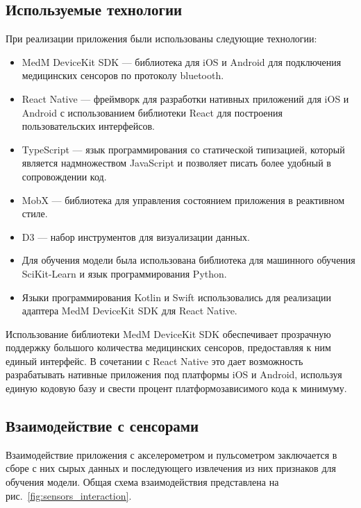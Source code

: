 \documentclass[14pt]{matmex-diploma-custom}
\begin{document}
\subsection{Используемые технологии}
При реализации приложения были использованы следующие технологии:
\begin{itemize}
\item MedM DeviceKit SDK --- библиотека для iOS и Android для подключения
  медицинских сенсоров по протоколу bluetooth.
\item React Native --- фреймворк для разработки нативных приложений для iOS и
  Android с использованием библиотеки React для построения пользовательских
  интерфейсов.
\item TypeScript --- язык программирования со статической типизацией, который
  является надмножеством JavaScript и позволяет писать более удобный в
  сопровождении код.
\item MobX --- библиотека для управления состоянием приложения в реактивном
  стиле.
\item D3 --- набор инструментов для визуализации данных.
\item Для обучения модели была использована библиотека для машинного обучения
  SciKit-Learn и язык программирования Python.
\item Языки программирования Kotlin и Swift использовались для реализации
  адаптера MedM DeviceKit SDK для React Native.
\end{itemize}

Использование библиотеки MedM DeviceKit SDK обеспечивает прозрачную поддержку
большого количества медицинских сенсоров, предоставляя к ним единый интерфейс. В
сочетании с React Native это дает возможность разрабатывать нативные приложения
под платформы iOS и Android, используя единую кодовую базу и свести процент
платформозависимого кода к минимуму.

\subsection{Взаимодействие с сенсорами}
Взаимодействие приложения с акселерометром и пульсометром заключается в сборе с
них сырых данных и последующего извлечения из них признаков для обучения модели.
Общая схема взаимодействия представлена на рис.~\ref{fig:sensors_interaction}.
\end{document}
